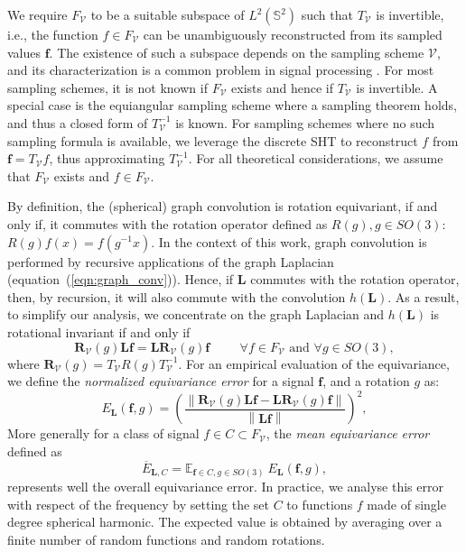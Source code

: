 \documentclass{article} %
\newcommand{\norm}[1]{\left\lVert#1\right\rVert}
\renewcommand{\b}[1]{{\bm{#1}}}  %
\renewcommand{\S}{\mathbb{S}}
\newcommand{\V}{\mathcal{V}}  %
\newcommand{\eqnref}[1]{equation~(\ref{eqn:#1})}
\begin{document}
We require $F_\V$ to be a suitable subspace of $L^2(\S^2)$ such that $T_\V$ is invertible, i.e., the function $f \in F_\V$ can be unambiguously reconstructed from its sampled values $\b{f}$.
The existence of such a subspace depends on the sampling scheme $\V$, and its characterization is a common problem in signal processing \citep{driscoll1994Fouriersphere}.
For most sampling schemes, it is not known if $F_\V$ exists and hence if $T_\V$ is invertible.
A special case is the equiangular sampling scheme where a sampling theorem holds, and thus a closed form of $T_\V^{-1}$ is known. %
For sampling schemes where no such sampling formula is available, we leverage the discrete SHT to reconstruct $f$ from $\b{f}=T_\V f$, thus approximating $T_\V^{-1}$.
For all theoretical considerations, we assume that $F_\V$ exists and $f \in F_\V$.

By definition, the (spherical) graph convolution is rotation equivariant, if and only if, it commutes with the rotation operator defined as $R(g), g\in SO(3)$: $R(g) f(x) = f\left(g^{-1} x \right)$.
In the context of this work, graph convolution is performed by recursive applications of the graph Laplacian (\eqnref{graph_conv}).
Hence, if $\b{L}$ commutes with the rotation operator, then, by recursion, it will also commute with the convolution $h(\b{L})$.
As a result, to simplify our analysis, we concentrate on the graph Laplacian and $h(\b{L})$ is rotational invariant if and only if
\begin{equation} \label{eq:equivariance}
	\b{R}_\V(g) \b{L} \b{f} = \b{L} \b{R}_\V(g) \b{f} \hspace{1cm} \forall f\in F_\V \text{ and } \forall g\in SO(3),
\end{equation}
where $\b{R}_\V(g) = T_\V R(g) T_\V^{-1}$. For an empirical evaluation of the equivariance, we define the \textit{normalized equivariance error} for a signal $\b{f}$, and a  rotation $g$ as:
\begin{equation} \label{eq:equivariance error}
	E_{\b{L}}(\b{f}, g) = \left(\frac{ \norm {\b{R}_\V(g) \b{L} \b{f} - \b{L} \b{R}_\V(g) \b{f}} }{\norm {\b{L} \b{f}}}\right)^2,
\end{equation}
More generally for a class of signal $f \in C \subset F_\V$, the \textit{mean equivariance error} defined as
\begin{equation} \label{eq:mean equivariance error}
	\overline E_{\b{L}, C} = \mathbb E_{\b{f}\in C, g\in SO(3)} \ E_{\b{L}}(\b{f}, g),
\end{equation}
represents well the overall equivariance error.
In practice, we analyse this error with respect of the frequency by setting the set $C$ to functions $f$ made of single degree spherical harmonic.
The expected value is obtained by averaging over a finite number of random functions and random rotations.
\end{document}

